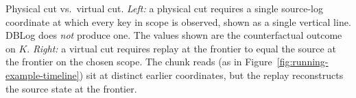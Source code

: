 \caption{Physical cut vs.\ virtual cut. \emph{Left:} a physical cut
requires a single source-log coordinate at which every key in scope is
observed, shown as a single vertical line. DBLog does \emph{not} produce
one. The values shown are the counterfactual outcome on $K$. \emph{Right:}
a virtual cut requires replay at the frontier to equal the source at
the frontier on the chosen scope. The chunk reads (as in
Figure~\ref{fig:running-example-timeline}) sit at distinct earlier
coordinates, but the replay reconstructs the source state at the frontier.}
\label{fig:virtual-vs-physical-cut}
